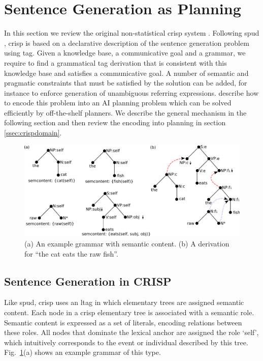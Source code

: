\section{Sentence Generation as Planning}
\label{sec:crisp}
In this section we review the original non-statistical {\sc crisp} system \cite{kollerstone2007}. 
Following {\sc spud} \cite{Stone2003a}, {\sc crisp} is based on a declarative description of the sentence generation problem using {\sc tag}. Given a knowledge base, a communicative goal and a grammar, we require to find a grammatical {\sc tag} derivation that is consistent with this knowledge base and satisfies a communicative goal. A number of semantic and pragmatic constraints that must be satisfied by the solution can be added, for instance to enforce generation of unambiguous referring expressions.  describe how to encode this problem into an AI planning problem which can be solved efficiently by off-the-shelf planners. We describe the general mechanism in the following section and then review the encoding into planning in section \ref{ssec:crispdomain}. 
\begin{figure}[th]
\begin{center}
\includegraphics[width=.8\textwidth]{figures/grammar.pdf}
\caption{\label{fig:grammar}(a) An example grammar with semantic content. (b) A derivation for ``the cat eats the raw fish''. }
\end{center}
\end{figure}

\subsection{Sentence Generation in CRISP}
Like {\sc spud}, {\sc crisp} uses an {\sc ltag} in which elementary trees are assigned semantic content. Each node in a {\sc crisp} elementary tree is associated with a semantic role. Semantic content is expressed as a set of literals, encoding relations between these roles. All nodes that dominate the lexical anchor are assigned the role `self', which intuitively corresponds to the event or individual described by this tree. Fig.~\ref{fig:grammar}(a) shows an example grammar of this type. 

